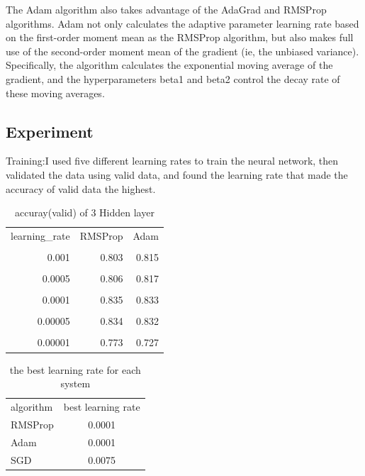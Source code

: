 \documentclass{article}
\begin{document}
The Adam algorithm also takes advantage of the AdaGrad and RMSProp algorithms. Adam not only calculates the adaptive parameter learning rate based on the first-order moment mean as the RMSProp algorithm, but also makes full use of the second-order moment mean of the gradient (ie, the unbiased variance). Specifically, the algorithm calculates the exponential moving average of the gradient, and the hyperparameters beta1 and beta2 control the decay rate of these moving averages.

\subsection{Experiment}

Training:I used five different learning rates to train the neural network, then validated the data using valid data, and found the learning rate that made the accuracy of valid data the highest.


\begin{table}[H]\label{section2TraningResult}
  \centering
  \caption{accuray(valid) of 3 Hidden layer	}
    \begin{tabular}{rrr}
    \multicolumn{1}{l}{learning\_rate} & \multicolumn{1}{l}{RMSProp } & \multicolumn{1}{l}{Adam } \\
          &       &  \\
    0.001 & 0.803 & 0.815 \\
          &       &  \\
    0.0005 & 0.806 & 0.817 \\
          &       &  \\
    0.0001 & 0.835 & 0.833 \\
          &       &  \\
    0.00005 & 0.834 & 0.832 \\
          &       &  \\
    0.00001 & 0.773 & 0.727 \\
    \end{tabular}%
  \label{tab:addlabel}%
\end{table}%


\begin{table}[H]\label{section2TestTable}
	\centering
	\caption{the best learning rate for each system}
	\begin{tabular}{lc}
		algorithm & best learning rate  \\
		RMSProp & 0.0001 \\
		Adam  & 0.0001 \\
		SGD   & 0.0075 \\
	\end{tabular}%
	\label{tab:addlabel}%
\end{table}%
\end{document}
